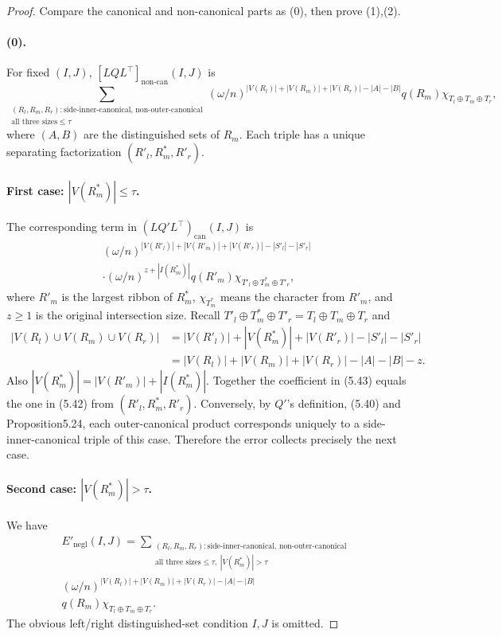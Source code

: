 \begin{proof}Compare the canonical and non-canonical parts as (0), then prove (1),(2).
\paragraph{(0).} For fixed $(I,J)$, $[LQL^\top]_{\mathrm{non\text{-}can}}(I,J)$ is
\[\sum_{\substack{(R_l,R_m,R_r):\text{side-inner-canonical, non-outer-canonical}\\\text{all three sizes}\le\tau}}(\omega/n)^{|V(R_l)|+|V(R_m)|+|V(R_r)|-|A|-|B|}q(R_m)\chi_{T_l\oplus T_m\oplus T_r},\tag{5.42}\]
where $(A,B)$ are the distinguished sets of $R_m$. Each triple has a unique separating factorization $(R'_l,R^*_m,R'_r)$.
\paragraph{First case: $|V(R^*_m)|\le\tau$.} The corresponding term in $(LQ'L^\top)_{\mathrm{can}}(I,J)$ is
\begin{multline*}(\omega/n)^{|V(R'_l)|+|V(R'_m)|+|V(R'_r)|-|S'_l|-|S'_r|}\\\cdot(\omega/n)^{z+|I(R^*_m)|}q(R'_m)\chi_{T'_l\oplus T^*_m\oplus T'_r},\tag{5.43}\end{multline*}
where $R'_m$ is the largest ribbon of $R^*_m$, $\chi_{T^*_m}$ means the character from $R'_m$, and $z\ge1$ is the original intersection size. Recall $T'_l\oplus T^*_m\oplus T'_r=T_l\oplus T_m\oplus T_r$ and
\begin{align*}|V(R_l)\cup V(R_m)\cup V(R_r)|&=|V(R'_l)|+|V(R^*_m)|+|V(R'_r)|-|S'_l|-|S'_r|\\&=|V(R_l)|+|V(R_m)|+|V(R_r)|-|A|-|B|-z.\end{align*}
Also $|V(R^*_m)|=|V(R'_m)|+|I(R^*_m)|$. Together the coefficient in (5.43) equals the one in (5.42) from $(R'_l,R^*_m,R'_r)$. Conversely, by $Q'$'s definition, (5.40) and Proposition5.24, each outer-canonical product corresponds uniquely to a side-inner-canonical triple of this case. Therefore the error collects precisely the next case.
\paragraph{Second case: $|V(R^*_m)|>\tau$.} We have
\begin{multline*}E'_{\mathrm{negl}}(I,J)=\sum_{\substack{(R_l,R_m,R_r):\text{side-inner-canonical, non-outer-canonical}\\\text{all three sizes}\le\tau,\ |V(R^*_m)|>\tau}}\\
(\omega/n)^{|V(R_l)|+|V(R_m)|+|V(R_r)|-|A|-|B|}\\
q(R_m)\chi_{T_l\oplus T_m\oplus T_r}.\tag{5.44}\end{multline*}
The obvious left/right distinguished-set condition $I,J$ is omitted.

\end{proof}
